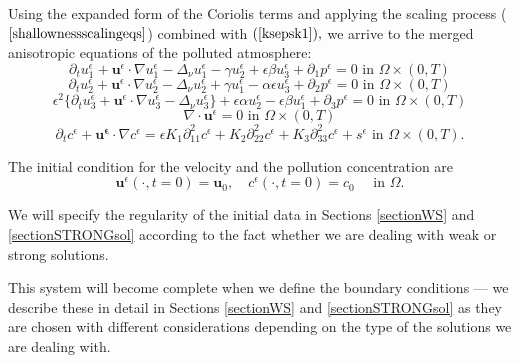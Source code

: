 \documentclass[11pt]{article}
\begin{document}
Using the expanded form of the Coriolis terms and applying the scaling process ($\ref{shallownessscalingeqs}$) combined with $(\ref{ksepsk1}),$ we arrive to the merged anisotropic equations of the polluted atmosphere:
%
\begin{equation} \label{ANSC1}
\partial_t u^\epsilon _1 + \mathbf{u}^\epsilon \cdot \nabla u^\epsilon _1 -\Delta_\nu u^\epsilon _1 -\gamma u_2^\epsilon + \epsilon \beta u_3^\epsilon + \partial_1 p^\epsilon = 0 \text{ in } \Omega \times (0,T)
\end{equation}
%
\begin{equation} \label{ANSC2}
\partial_t u_2^\epsilon + \mathbf{u}^\epsilon \cdot \nabla u_2^\epsilon -\Delta_\nu u_2^\epsilon + \gamma u_1^\epsilon - \alpha \epsilon u^\epsilon_3 + \partial_2 p^\epsilon = 0 \text{ in } \Omega \times (0,T)
\end{equation}
%
\begin{equation} \label{ANSC3}
\epsilon^2 \{ \partial_t u_3^\epsilon + \mathbf{u}^\epsilon \cdot \nabla u_3^\epsilon -\Delta_\nu u_3^{\epsilon} \} + \epsilon \alpha u^\epsilon_2 - \epsilon \beta u_1^\epsilon + \partial_3 p^\epsilon = 0 \text{ in } \Omega \times (0,T)
\end{equation}
%
\begin{equation} \label{ANSC4}
\nabla \cdot \mathbf{u}^\epsilon= 0 \text{ in } \Omega \times (0,T)
\end{equation}
%
\begin{equation} \label{ANSC5}
\partial_t c^\epsilon + \mathbf{u^\epsilon} \cdot \nabla c^\epsilon = \epsilon K_1 \partial_{11} ^ 2 c^\epsilon + K_2 \partial_{22} ^ 2 c^\epsilon + K_3 \partial_{33} ^ 2 c^\epsilon + s^\epsilon \text{ in } \Omega \times (0,T).
\end{equation}

The initial condition for the velocity and the pollution concentration are
%
\begin{equation} \label{ANSC_init}
\mathbf{u}^\epsilon (\cdot, t = 0) = \mathbf{u}_0, \quad c^\epsilon (\cdot, t=0) = c_0 \quad \text{ in } \Omega.
\end{equation}

We will specify the regularity of the initial data in Sections \ref{sectionWS} and \ref{sectionSTRONGsol} according to the fact whether we are dealing with weak or strong solutions.

This system will become complete when we define the boundary conditions --- we describe these in detail in Sections \ref{sectionWS} and \ref{sectionSTRONGsol} as they are chosen with different considerations depending on the type of the solutions we are dealing with.
\end{document}
